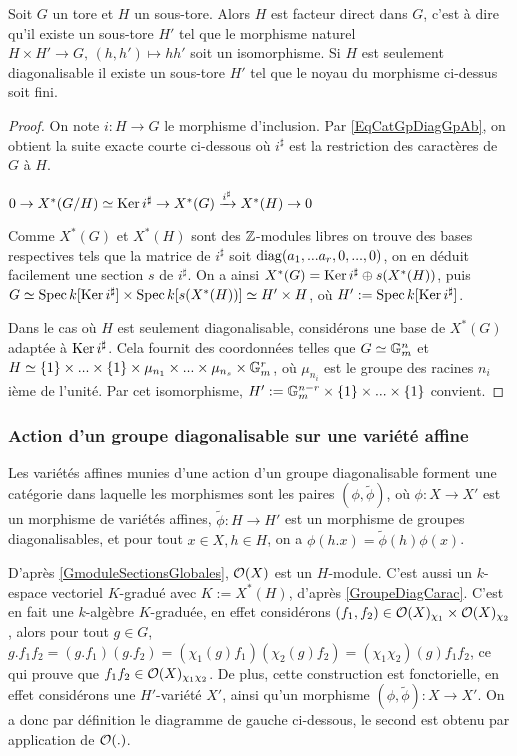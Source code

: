 \begin{prop}\label{GDiagSubtorusFacteurDirect}
Soit $G$ un tore et $H$ un sous-tore. Alors $H$ est facteur direct dans $G$, c'est à dire qu'il existe un sous-tore $H'$ tel que le morphisme naturel $H\times H'\rightarrow G,\, (h,h')\mapsto hh'$ soit un isomorphisme. Si $H$ est seulement diagonalisable il existe un sous-tore $H'$ tel que le noyau du morphisme ci-dessus soit fini.
\end{prop}
\begin{proof}
On note $i:H\rightarrow G$ le morphisme d'inclusion. Par \ref{EqCatGpDiagGpAb}, on obtient la suite exacte courte ci-dessous où $i^\sharp$ est la restriction des caractères de $
G$ à $H$.
\begin{center}
$0\rightarrow X^*(G/H)\simeq\operatorname{Ker} i^\sharp\rightarrow X^*(G)\xrightarrow{i^\sharp} X^*(H)\rightarrow 0$
\end{center}
Comme $X^*(G)$ et $X^*(H)$ sont des $\mathbb{Z}$-modules libres on trouve des bases respectives tels que la matrice de $i^\sharp$ soit $\operatorname{diag}(a_1,...a_r,0,...,0)$, on en déduit facilement une section $s$ de $i^\sharp$. On a ainsi $X^*(G)=\operatorname{Ker} i^\sharp\oplus s(X^*(H))$, puis $G\simeq \operatorname{Spec} k[\operatorname{Ker} i^\sharp] \times \operatorname{Spec} k[s(X^*(H))]\simeq H'\times H$, où $H':=\operatorname{Spec} k[\operatorname{Ker} i^\sharp]$.

Dans le cas où $H$ est seulement diagonalisable, considérons une base de $X^*(G)$ adaptée à $\operatorname{Ker} i^\sharp$. Cela fournit des coordonnées telles que $G\simeq \mathbb{G}_m^n$ et $H\simeq \lbrace 1\rbrace\times...\times\lbrace 1\rbrace\times\mu_{n_1}\times...\times\mu_{n_s}\times\mathbb{G}_m^r$, où $\mu_{n_i}$ est le groupe des racines $n_i$ième de l'unité. Par cet isomorphisme, $H':=\mathbb{G}_m^{n-r}\times  \lbrace 1\rbrace\times...\times  \lbrace 1\rbrace$ convient.
\end{proof}

\subsubsection{Action d'un groupe diagonalisable sur une variété affine}

Les variétés affines munies d'une action d'un groupe diagonalisable forment une catégorie dans laquelle les morphismes sont les paires $(\phi,\widetilde{\phi})$, où $\phi:X\rightarrow X'$ est un morphisme de variétés affines, $\widetilde{\phi}:H\rightarrow H'$ est un morphisme de groupes diagonalisables, et pour tout $x\in X, h\in H$, on a $\phi(h.x)=\widetilde{\phi}(h)\phi(x)$.

D'après \ref{GmoduleSectionsGlobales}, $\mathcal{O}(X)$ est un $H$-module. C'est aussi un $k$-espace vectoriel $K$-gradué avec $K:=X^*(H)$, d'après \ref{GroupeDiagCarac}. C'est en fait une $k$-algèbre $K$-graduée, en effet considérons $(f_1, f_2)\in \mathcal{O}(X)_{\chi_1}\times \mathcal{O}(X)_{\chi_2}$, alors pour tout $g\in G$, $g.f_1f_2=(g.f_1)(g.f_2)=(\chi_1(g)f_1)(\chi_2(g)f_2)=(\chi_1\chi_2)(g)f_1f_2$, ce qui prouve que $f_1f_2\in \mathcal{O}(X)_{\chi_1\chi_2}$. De plus, cette construction est fonctorielle, en effet considérons une $H'$-variété $X'$, ainsi qu'un morphisme $(\phi,\widetilde{\phi}):X\rightarrow X'$. On a donc par définition le diagramme de gauche ci-dessous, le second est obtenu par application de $\mathcal{O}(.)$.

